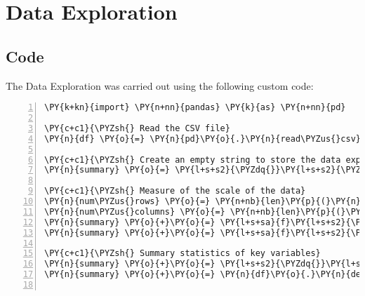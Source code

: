 \documentclass[11pt]{article}
\begin{document}
\section*{Data Exploration} \subsection*{Code}The Data Exploration was carried out using the following custom code:

\begin{Verbatim}[commandchars=\\\{\},numbers=left,firstnumber=1,stepnumber=1,formatcom=\footnotesize]
\PY{k+kn}{import} \PY{n+nn}{pandas} \PY{k}{as} \PY{n+nn}{pd}

\PY{c+c1}{\PYZsh{} Read the CSV file}
\PY{n}{df} \PY{o}{=} \PY{n}{pd}\PY{o}{.}\PY{n}{read\PYZus{}csv}\PY{p}{(}\PY{l+s+s2}{\PYZdq{}}\PY{l+s+s2}{diabetes\PYZus{}binary\PYZus{}health\PYZus{}indicators\PYZus{}BRFSS2015.csv}\PY{l+s+s2}{\PYZdq{}}\PY{p}{)}

\PY{c+c1}{\PYZsh{} Create an empty string to store the data exploration summary}
\PY{n}{summary} \PY{o}{=} \PY{l+s+s2}{\PYZdq{}}\PY{l+s+s2}{\PYZdq{}}

\PY{c+c1}{\PYZsh{} Measure of the scale of the data}
\PY{n}{num\PYZus{}rows} \PY{o}{=} \PY{n+nb}{len}\PY{p}{(}\PY{n}{df}\PY{p}{)}
\PY{n}{num\PYZus{}columns} \PY{o}{=} \PY{n+nb}{len}\PY{p}{(}\PY{n}{df}\PY{o}{.}\PY{n}{columns}\PY{p}{)}
\PY{n}{summary} \PY{o}{+}\PY{o}{=} \PY{l+s+sa}{f}\PY{l+s+s2}{\PYZdq{}}\PY{l+s+s2}{Number of rows: }\PY{l+s+si}{\PYZob{}}\PY{n}{num\PYZus{}rows}\PY{l+s+si}{\PYZcb{}}\PY{l+s+se}{\PYZbs{}n}\PY{l+s+s2}{\PYZdq{}}
\PY{n}{summary} \PY{o}{+}\PY{o}{=} \PY{l+s+sa}{f}\PY{l+s+s2}{\PYZdq{}}\PY{l+s+s2}{Number of columns: }\PY{l+s+si}{\PYZob{}}\PY{n}{num\PYZus{}columns}\PY{l+s+si}{\PYZcb{}}\PY{l+s+se}{\PYZbs{}n}\PY{l+s+se}{\PYZbs{}n}\PY{l+s+s2}{\PYZdq{}}

\PY{c+c1}{\PYZsh{} Summary statistics of key variables}
\PY{n}{summary} \PY{o}{+}\PY{o}{=} \PY{l+s+s2}{\PYZdq{}}\PY{l+s+s2}{Summary Statistics:}\PY{l+s+se}{\PYZbs{}n}\PY{l+s+s2}{\PYZdq{}}
\PY{n}{summary} \PY{o}{+}\PY{o}{=} \PY{n}{df}\PY{o}{.}\PY{n}{describe}\PY{p}{(}\PY{p}{)}\PY{o}{.}\PY{n}{to\PYZus{}string}\PY{p}{(}\PY{p}{)} \PY{o}{+} \PY{l+s+s2}{\PYZdq{}}\PY{l+s+se}{\PYZbs{}n}\PY{l+s+se}{\PYZbs{}n}\PY{l+s+s2}{\PYZdq{}}


\end{Verbatim}
\end{document}
